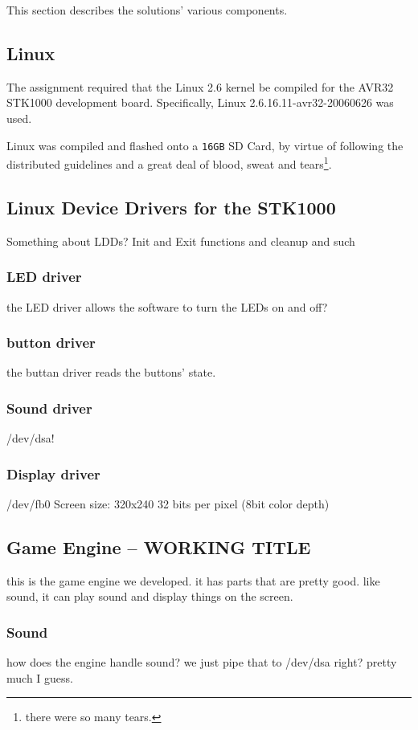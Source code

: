 This section describes the solutions' various components.

\subsection{Linux}
	The assignment required that the Linux 2.6 kernel be compiled for the AVR32 STK1000 development board.
	Specifically, Linux 2.6.16.11-avr32-20060626 was used.

	Linux was compiled and flashed onto a \texttt{16GB} SD Card, by virtue of following the distributed guidelines and a great deal of blood, sweat and tears\footnote{there were so many tears.}.

\subsection{Linux Device Drivers for the STK1000}
	Something about LDDs?
	Init and Exit functions and cleanup and such

	\subsubsection{LED driver}
		the LED driver allows the software to turn the LEDs on and off?
	\subsubsection{button driver}
		the buttan driver reads the buttons' state.	

	\subsubsection{Sound driver}
		/dev/dsa!
	\subsubsection{Display driver}
		/dev/fb0
		Screen size: 320x240
		32 bits per pixel (8bit color depth)

\subsection{Game Engine -- WORKING TITLE}
	this is the game engine we developed. it has parts that are pretty good. like sound, it can play sound and display things on the screen.
	\subsubsection{Sound}
		how does the engine handle sound?
		we just pipe that to /dev/dsa right?
		pretty much I guess.
